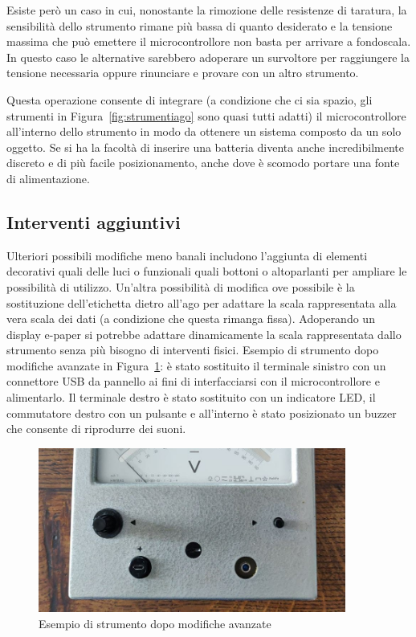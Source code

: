 \documentclass[12pt,a4paper]{report}
\begin{document}
Esiste però un caso in cui, nonostante la rimozione delle resistenze di taratura, la sensibilità dello strumento rimane più bassa di quanto
desiderato e la tensione massima che può emettere il microcontrollore non basta per arrivare a fondoscala. In questo caso le alternative
sarebbero adoperare un survoltore per raggiungere la tensione necessaria oppure rinunciare e provare con un altro strumento.

Questa operazione consente di integrare (a condizione che ci sia spazio, gli strumenti in Figura~\ref{fig:strumentiago} sono quasi tutti
adatti) il microcontrollore all'interno dello strumento in modo da ottenere un sistema composto da un solo oggetto.
Se si ha la facoltà di inserire una batteria diventa anche incredibilmente discreto e di più facile posizionamento, anche dove è
scomodo portare una fonte di alimentazione.

\subsection{Interventi aggiuntivi}
Ulteriori possibili modifiche meno banali includono l'aggiunta di elementi decorativi quali delle luci o funzionali quali bottoni o altoparlanti
per ampliare le possibilità di utilizzo. Un'altra possibilità di modifica ove possibile è la sostituzione dell'etichetta dietro all'ago per adattare
la scala rappresentata alla vera scala dei dati (a condizione che questa rimanga fissa). Adoperando un display e-paper si potrebbe
adattare dinamicamente la scala rappresentata dallo strumento senza più bisogno di interventi fisici. Esempio di strumento dopo
modifiche avanzate in Figura~\ref{fig:interventocompleto}: è stato sostituito il terminale sinistro con un connettore USB da pannello
ai fini di interfacciarsi con il microcontrollore e alimentarlo. Il terminale destro è stato sostituito con un indicatore LED, il commutatore
destro con un pulsante e all'interno è stato posizionato un buzzer che consente di riprodurre dei suoni.

\begin{figure}[h]
  \centering
  \includegraphics[width=0.9\textwidth]{interventocompleto}
  \caption{Esempio di strumento dopo modifiche avanzate}
  \label{fig:interventocompleto}
\end{figure}
\end{document}
